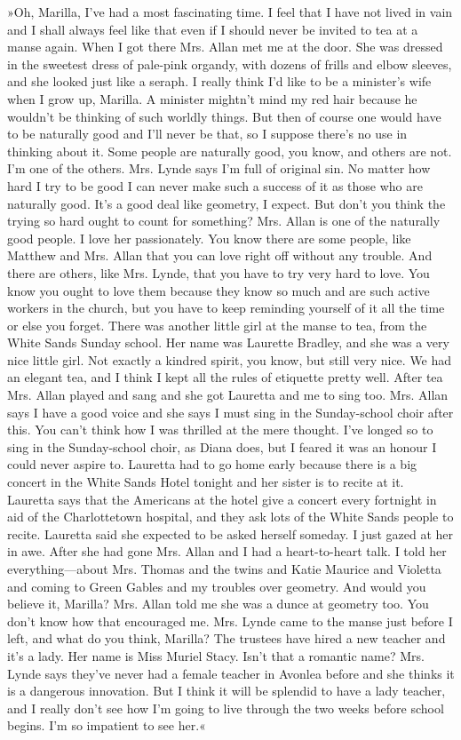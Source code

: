 »Oh, Marilla, I’ve had a most fascinating time. I feel that I have not lived in vain and I shall always feel like that even if I should never be invited to tea at a manse again. When I got there Mrs. Allan met me at the door. She was dressed in the sweetest dress of pale-pink organdy, with dozens of frills and elbow sleeves, and she looked just like a seraph. I really think I’d like to be a minister’s wife when I grow up, Marilla. A minister mightn’t mind my red hair because he wouldn’t be thinking of such worldly things. But then of course one would have to be naturally good and I’ll never be that, so I suppose there’s no use in thinking about it. Some people are naturally good, you know, and others are not. I’m one of the others. Mrs. Lynde says I’m full of original sin. No matter how hard I try to be good I can never make such a success of it as those who are naturally good. It’s a good deal like geometry, I expect. But don’t you think the trying so hard ought to count for something? Mrs. Allan is one of the naturally good people. I love her passionately. You know there are some people, like Matthew and Mrs. Allan that you can love right off without any trouble. And there are others, like Mrs. Lynde, that you have to try very hard to love. You know you ought to love them because they know so much and are such active workers in the church, but you have to keep reminding yourself of it all the time or else you forget. There was another little girl at the manse to tea, from the White Sands Sunday school. Her name was Laurette Bradley, and she was a very nice little girl. Not exactly a kindred spirit, you know, but still very nice. We had an elegant tea, and I think I kept all the rules of etiquette pretty well. After tea Mrs. Allan played and sang and she got Lauretta and me to sing too. Mrs. Allan says I have a good voice and she says I must sing in the Sunday-school choir after this. You can’t think how I was thrilled at the mere thought. I’ve longed so to sing in the Sunday-school choir, as Diana does, but I feared it was an honour I could never aspire to. Lauretta had to go home early because there is a big concert in the White Sands Hotel tonight and her sister is to recite at it. Lauretta says that the Americans at the hotel give a concert every fortnight in aid of the Charlottetown hospital, and they ask lots of the White Sands people to recite. Lauretta said she expected to be asked herself someday. I just gazed at her in awe. After she had gone Mrs. Allan and I had a heart-to-heart talk. I told her everything—about Mrs. Thomas and the twins and Katie Maurice and Violetta and coming to Green Gables and my troubles over geometry. And would you believe it, Marilla? Mrs. Allan told me she was a dunce at geometry too. You don’t know how that encouraged me. Mrs. Lynde came to the manse just before I left, and what do you think, Marilla? The trustees have hired a new teacher and it’s a lady. Her name is Miss Muriel Stacy. Isn’t that a romantic name? Mrs. Lynde says they’ve never had a female teacher in Avonlea before and she thinks it is a dangerous innovation. But I think it will be splendid to have a lady teacher, and I really don’t see how I’m going to live through the two weeks before school begins. I’m so impatient to see her.«